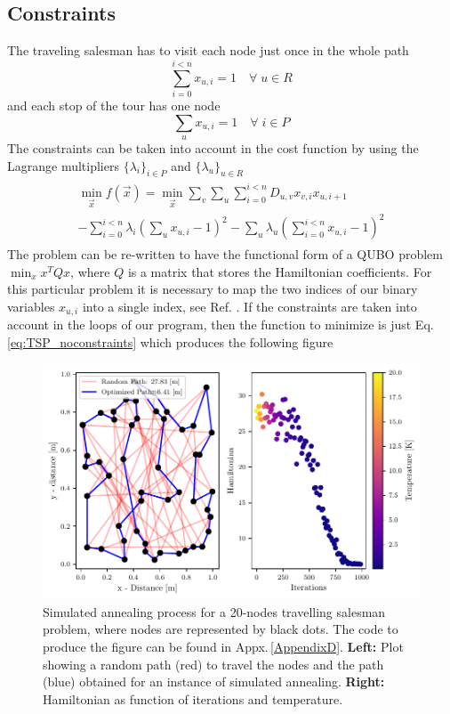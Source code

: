 \subsection{Constraints}
The traveling salesman has to visit each node just once in the whole path
\begin{equation}
    \sum_{i=0}^{i<n}x_{u,i} = 1 \quad  \forall \; u \in R
\end{equation}
and each stop of the tour has one node
\begin{equation}
    \sum_{u}x_{u, i} = 1 \quad  \forall \; i \in P
\end{equation}
The constraints can be taken into account in the cost function by using the Lagrange multipliers $\{\lambda_{i}\}_{i \in P}$ and $\{\lambda_{u}\}_{u \in R}$
\begin{align}
        \label{eq: ObjectiveMatrixFunction}
    \begin{split}
   \min_{\vec{x}} f(\vec{x}) = \min_{\vec{x}} \sum_{v} \sum_{u} \sum_{i=0}^{i<n}D_{u,v}x_{v,i}x_{u, i+1}\\
   - \sum_{i=0}^{i<n}\lambda_{i}\left(\sum_{u} x_{u, i} - 1\right)^{2} - \sum_{u}\lambda_{u} \left( \sum_{i=0}^{i<n}x_{u,i} - 1\right)^{2}
\end{split}
\end{align}
The problem can be re-written to have the functional form of a QUBO problem $\min_{x}x^{T}Qx$, where $Q$ is a matrix that stores the Hamiltonian coefficients. For this particular problem it is necessary to map the two indices of our binary variables $x_{u,i}$ into a single index, see Ref. \cite{Jain2021SolvingComputer}.
If the constraints are taken into account in the loops of our program, then the function to minimize is just Eq.\,\eqref{eq:TSP_noconstraints} which produces the following figure
\begin{figure}[H]
    \centering
    \includegraphics[width=\textwidth]{Figures/TSP_SA.pdf}
    \caption{Simulated annealing process for a 20-nodes travelling salesman problem, where nodes are represented by black dots. The code to produce the figure can be found in Appx.\,\ref{AppendixD}.\textbf{ Left:} Plot showing a random path (red) to travel the nodes and the path (blue) obtained for an instance of simulated annealing. \textbf{Right:} Hamiltonian as function of iterations and temperature.}
    \label{fig:TSP_SA}
\end{figure}

